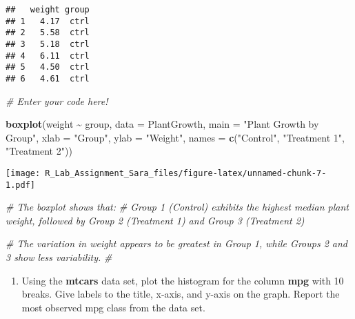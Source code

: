 \documentclass[
]{article}
\newenvironment{Shaded}{\begin{snugshade}}{\end{snugshade}}
\newcommand{\AttributeTok}[1]{\textcolor[rgb]{0.13,0.29,0.53}{#1}}
\newcommand{\CommentTok}[1]{\textcolor[rgb]{0.56,0.35,0.01}{\textit{#1}}}
\newcommand{\DecValTok}[1]{\textcolor[rgb]{0.00,0.00,0.81}{#1}}
\newcommand{\FunctionTok}[1]{\textcolor[rgb]{0.13,0.29,0.53}{\textbf{#1}}}
\newcommand{\NormalTok}[1]{#1}
\newcommand{\SpecialCharTok}[1]{\textcolor[rgb]{0.81,0.36,0.00}{\textbf{#1}}}
\newcommand{\StringTok}[1]{\textcolor[rgb]{0.31,0.60,0.02}{#1}}
\providecommand{\tightlist}{%
  \setlength{\itemsep}{0pt}\setlength{\parskip}{0pt}}
\begin{document}
\begin{verbatim}
##   weight group
## 1   4.17  ctrl
## 2   5.58  ctrl
## 3   5.18  ctrl
## 4   6.11  ctrl
## 5   4.50  ctrl
## 6   4.61  ctrl
\end{verbatim}

\begin{Shaded}
\begin{Highlighting}[]
\CommentTok{\# Enter your code here!}

\FunctionTok{boxplot}\NormalTok{(weight }\SpecialCharTok{\textasciitilde{}}\NormalTok{ group, }\AttributeTok{data =}\NormalTok{ PlantGrowth,}
        \AttributeTok{main =} \StringTok{"Plant Growth by Group"}\NormalTok{,}
        \AttributeTok{xlab =} \StringTok{"Group"}\NormalTok{, }\AttributeTok{ylab =} \StringTok{"Weight"}\NormalTok{,}
        \AttributeTok{names =} \FunctionTok{c}\NormalTok{(}\StringTok{"Control"}\NormalTok{, }\StringTok{"Treatment 1"}\NormalTok{, }\StringTok{"Treatment 2"}\NormalTok{))}
\end{Highlighting}
\end{Shaded}

\texttt{[image: R\_Lab\_Assignment\_Sara\_files/figure-latex/unnamed-chunk-7-1.pdf]}

\begin{Shaded}
\begin{Highlighting}[]
\CommentTok{\# The boxplot shows that:}
\CommentTok{\#         Group 1 (Control) exhibits the highest median plant weight, followed by Group 2 (Treatment 1)           and Group 3 (Treatment 2)}

\CommentTok{\#         The variation in weight appears to be greatest in Group 1, while Groups 2 and 3 show less              variability.}
\CommentTok{\#}
\end{Highlighting}
\end{Shaded}

\begin{enumerate}
\def\labelenumi{\alph{enumi}.}
\setcounter{enumi}{1}
\tightlist
\item
  Using the \textbf{mtcars} data set, plot the histogram for the column
  \textbf{mpg} with 10 breaks. Give labels to the title, x-axis, and
  y-axis on the graph. Report the most observed mpg class from the data
  set.
\end{enumerate}

\begin{Shaded}
\end{Shaded}
\end{document}
